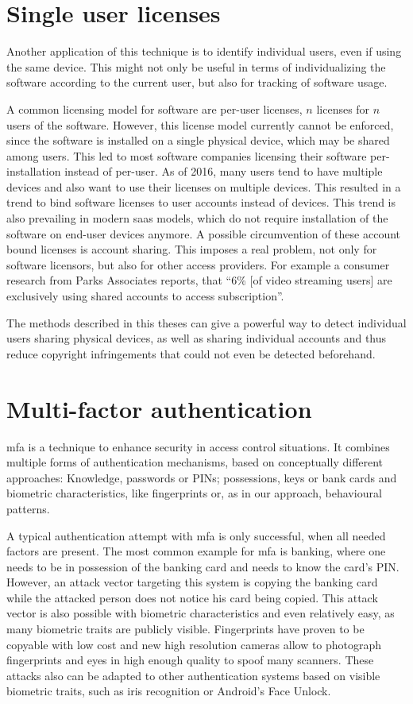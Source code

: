 \section{Single user licenses}
Another application of this technique is to identify individual users, even if using the same device. This might not only be useful in terms of individualizing the software according to the current user, but also for tracking of software usage.

A common licensing model for software are per-user licenses, \ie $n$ licenses for $n$ users of the software. However, this license model currently cannot be enforced, since the software is installed on a single physical device, which may be shared among users. This led to most software companies licensing their software per-installation instead of per-user.
As of 2016, many users tend to have multiple devices and also want to use their licenses on multiple devices. This resulted in a trend to bind software licenses to user accounts instead of devices. This trend is also prevailing in modern \gls{saas} models, which do not require installation of the software on end-user devices anymore.
A possible circumvention of these account bound licenses is account sharing. This imposes a real problem, not only for software licensors, but also for other access providers. For example a consumer research from Parks Associates\cite{accountsharing} reports, that ``6\% [of video streaming users] are exclusively using shared accounts to access subscription''. 

The methods described in this theses can give a powerful way to detect individual users sharing physical devices, as well as sharing individual accounts and thus reduce copyright infringements that could not even be detected beforehand.

\section{Multi-factor authentication}
\gls{mfa} is a technique to enhance security in access control situations. It combines multiple forms of authentication mechanisms, based on conceptually different approaches: Knowledge, \eg passwords or PINs; possessions, \eg keys or bank cards and biometric characteristics, like fingerprints or, as in our approach, behavioural patterns.

A typical authentication attempt with \gls{mfa} is only successful, when all needed factors are present. The most common example for \gls{mfa} is banking, where one needs to be in possession of the banking card and needs to know the card's PIN. However, an attack vector targeting this system is copying the banking card while the attacked person does not notice his card being copied. This attack vector is also possible with biometric characteristics and even relatively easy, as many biometric traits are publicly visible. Fingerprints have proven to be copyable with low cost\cite{starbug2008bastel} and new high resolution cameras allow to photograph fingerprints and eyes in high enough quality to spoof many scanners\cite{fiebig2014security}. These attacks also can be adapted to other authentication systems based on visible biometric traits, such as iris recognition or Android's Face Unlock.

